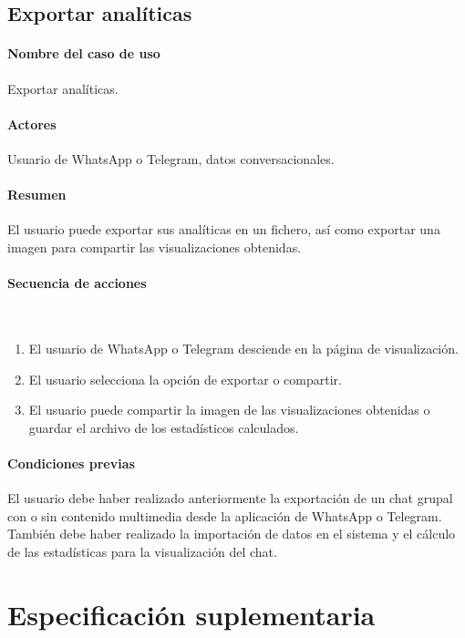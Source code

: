 \subsection{Exportar analíticas}

\paragraph{Nombre del caso de uso} Exportar analíticas.
\paragraph{Actores} Usuario de WhatsApp o Telegram, datos conversacionales.
\paragraph{Resumen} El usuario puede exportar sus analíticas en un fichero, así como exportar una imagen para compartir las visualizaciones obtenidas.
\paragraph{Secuencia de acciones}\mbox{}\\

\begin{enumerate}
	\item El usuario de WhatsApp o Telegram desciende en la página de visualización.
	\item El usuario selecciona la opción de exportar o compartir.
	\item El usuario puede compartir la imagen de las visualizaciones obtenidas o guardar el archivo de los estadísticos calculados.
\end{enumerate}

\paragraph{Condiciones previas} El usuario debe haber realizado anteriormente la exportación de un chat grupal con o sin contenido multimedia desde la aplicación de WhatsApp o Telegram. También debe haber realizado la importación de datos en el sistema y el cálculo de las estadísticas para la visualización del chat.



\section{Especificación suplementaria}
\label{subsect:suplementary-specification}


